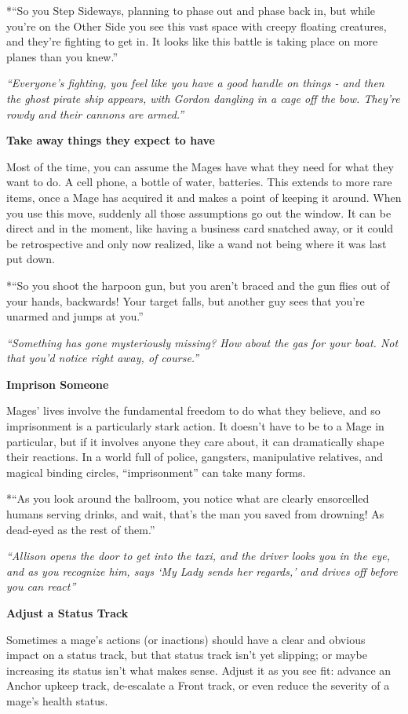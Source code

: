 \documentclass[
  oneside,
  statementpaper,
  9pt]{memoir}
\begin{document}
*``So you Step Sideways, planning to phase out and phase back in, but
while you're on the Other Side you see this vast space with creepy
floating creatures, and they're fighting to get in. It looks like this
battle is taking place on more planes than you knew.''

\emph{``Everyone's fighting, you feel like you have a good handle on
things - and then the ghost pirate ship appears, with Gordon dangling in
a cage off the bow. They're rowdy and their cannons are armed.''}

\textbf{Take away things they expect to have}

Most of the time, you can assume the Mages have what they need for what
they want to do. A cell phone, a bottle of water, batteries. This
extends to more rare items, once a Mage has acquired it and makes a
point of keeping it around. When you use this move, suddenly all those
assumptions go out the window. It can be direct and in the moment, like
having a business card snatched away, or it could be retrospective and
only now realized, like a wand not being where it was last put down.

*``So you shoot the harpoon gun, but you aren't braced and the gun flies
out of your hands, backwards! Your target falls, but another guy sees
that you're unarmed and jumps at you.''

\emph{``Something has gone mysteriously missing? How about the gas for
your boat. Not that you'd notice right away, of course.''}

\textbf{Imprison Someone}

Mages' lives involve the fundamental freedom to do what they believe,
and so imprisonment is a particularly stark action. It doesn't have to
be to a Mage in particular, but if it involves anyone they care about,
it can dramatically shape their reactions. In a world full of police,
gangsters, manipulative relatives, and magical binding circles,
``imprisonment'' can take many forms.

*``As you look around the ballroom, you notice what are clearly
ensorcelled humans serving drinks, and wait, that's the man you saved
from drowning! As dead-eyed as the rest of them.''

\emph{``Allison opens the door to get into the taxi, and the driver
looks you in the eye, and as you recognize him, says `My Lady sends her
regards,' and drives off before you can react''}

\textbf{Adjust a Status Track}

Sometimes a mage's actions (or inactions) should have a clear and
obvious impact on a status track, but that status track isn't yet
slipping; or maybe increasing its status isn't what makes sense. Adjust
it as you see fit: advance an Anchor upkeep track, de-escalate a Front
track, or even reduce the severity of a mage's health status.
\end{document}
